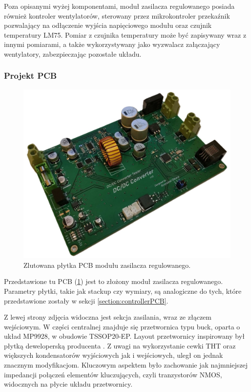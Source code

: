 Poza opisanymi wyżej komponentami, moduł zasilacza regulowanego posiada również kontroler
wentylatorów, sterowany przez mikrokontroler przekaźnik pozwalający na odłączenie wyjścia napięciowego modułu 
oraz czujnik temperatury LM75. Pomiar z czujnika temperatury może być zapisywany wraz
z innymi pomiarami, a także wykorzystywany jako wyzwalacz załączający wentylatory, zabezpieczając pozostałe układu.


\subsubsection{Projekt PCB}

\begin{figure}[h!]
    \begin{center}
        \includegraphics[width = 17cm]{images/converter_PCB.jpg}
        \caption{Zlutowana płytka PCB modułu zasilacza regulowanego.} 
        \label{fig:dcconverterPCB}
    \end{center}
\end{figure}

Przedstawione tu PCB (\ref{fig:dcconverterPCB}) jest to złożony moduł zasilacza regulowanego. Parametry płytki, 
takie jak stackup czy wymiary, są analogiczne do tych, które przedstawione zostały w sekcji \ref{section:controllerPCB}.

Z lewej strony zdjęcia widoczna jest sekcja zasilania, wraz ze złączem wejściowym. W części centralnej znajduje się 
przetwornica typu buck, oparta o układ MP9928, w obudowie TSSOP20-EP. Layout przetwornicy inspirowany był 
płytką deweloperską producenta \cite{evalboardMP9928}. Z uwagi na wykorzystanie cewki THT oraz większych kondensatorów 
wyjściowych jak i wejściowych, uległ on jednak znacznym modyfikacjom. Kluczowym aspektem było zachowanie jak 
najmniejszej impedancji połączeń elementów kluczujących, czyli tranzystorów NMOS, widocznych na płycie układu przetwornicy. 

